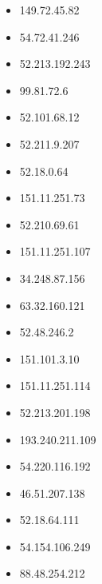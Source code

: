 \documentclass{article}
\begin{document}
\begin{itemize}
            \item 149.72.45.82
        
            \item 54.72.41.246
        
            \item 52.213.192.243
        
            \item 99.81.72.6
        
            \item 52.101.68.12
        
            \item 52.211.9.207
        
            \item 52.18.0.64
        
            \item 151.11.251.73
        
            \item 52.210.69.61
        
            \item 151.11.251.107
        
            \item 34.248.87.156
        
            \item 63.32.160.121
        
            \item 52.48.246.2
        
            \item 151.101.3.10
        
            \item 151.11.251.114
        
            \item 52.213.201.198
        
            \item 193.240.211.109
        
            \item 54.220.116.192
        
            \item 46.51.207.138
        
            \item 52.18.64.111
        
            \item 54.154.106.249
        
            \item 88.48.254.212
        

\end{itemize}
\end{document}
